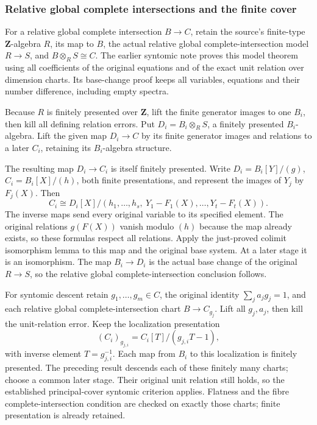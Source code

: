 \subsubsection{Relative global complete intersections and the finite cover}\label{algebra-proof-073-relative-global-complete-intersections-and-the-finite-cover}

For a relative global complete intersection \(B\to C\), retain the source's finite-type \(\mathbf Z\)-algebra \(R\), its map to \(B\), the actual relative global complete-intersection model \(R\to S\), and \(B\otimes_RS\cong C\). The earlier syntomic note proves this model theorem using all coefficients of the original equations and of the exact unit relation over dimension charts. Its base-change proof keeps all variables, equations and their number difference, including empty spectra.

Because \(R\) is finitely presented over \(\mathbf Z\), lift the finite generator images to one \(B_i\), then kill all defining relation errors. Put \(D_i=B_i\otimes_RS\), a finitely presented \(B_i\)-algebra. Lift the given map \(D_i\to C\) by its finite generator images and relations to a later \(C_i\), retaining its \(B_i\)-algebra structure.

The resulting map \(D_i\to C_i\) is itself finitely presented. Write \(D_i=B_i[Y]/(g)\), \(C_i=B_i[X]/(h)\), both finite presentations, and represent the images of \(Y_j\) by \(F_j(X)\). Then \[
C_i\cong D_i[X]/(h_1,\ldots,h_s,\ Y_1-F_1(X),\ldots,Y_t-F_t(X)).
\] The inverse maps send every original variable to its specified element. The original relations \(g(F(X))\) vanish modulo \((h)\) because the map already exists, so these formulas respect all relations. Apply the just-proved colimit isomorphism lemma to this map and the original base system. At a later stage it is an isomorphism. The map \(B_i\to D_i\) is the actual base change of the original \(R\to S\), so the relative global complete-intersection conclusion follows.

For syntomic descent retain \(g_1,\ldots,g_m\in C\), the original identity \(\sum_j a_jg_j=1\), and each relative global complete-intersection chart \(B\to C_{g_j}\). Lift all \(g_j,a_j\), then kill the unit-relation error. Keep the localization presentation \[
(C_i)_{g_{j,i}}=C_i[T]/(g_{j,i}T-1),
\] with inverse element \(T=g_{j,i}^{-1}\). Each map from \(B_i\) to this localization is finitely presented. The preceding result descends each of these finitely many charts; choose a common later stage. Their original unit relation still holds, so the established principal-cover syntomic criterion applies. Flatness and the fibre complete-intersection condition are checked on exactly those charts; finite presentation is already retained.

